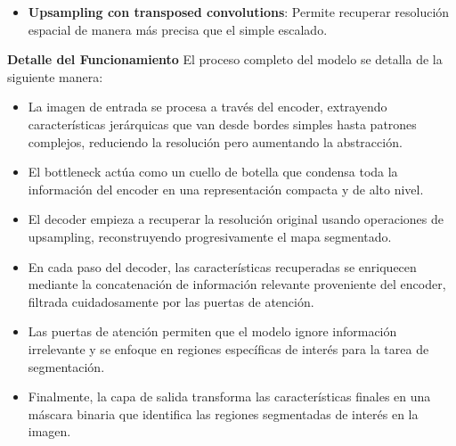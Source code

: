\begin{enumerate}
\begin{itemize}
\begin{itemize}
      

    \item \textbf{Upsampling con transposed convolutions}: Permite recuperar resolución espacial de manera más precisa que el simple escalado.
\end{itemize}


\textbf{Detalle del Funcionamiento}
El proceso completo del modelo se detalla de la siguiente manera:
\begin{itemize}
\item La imagen de entrada se procesa a través del encoder, extrayendo características jerárquicas que van desde bordes simples hasta patrones complejos, reduciendo la resolución pero aumentando la abstracción.
\item El bottleneck actúa como un cuello de botella que condensa toda la información del encoder en una representación compacta y de alto nivel.
\item El decoder empieza a recuperar la resolución original usando operaciones de upsampling, reconstruyendo progresivamente el mapa segmentado.
\item En cada paso del decoder, las características recuperadas se enriquecen mediante la concatenación de información relevante proveniente del encoder, filtrada cuidadosamente por las puertas de atención.
\item Las puertas de atención permiten que el modelo ignore información irrelevante y se enfoque en regiones específicas de interés para la tarea de segmentación.
\item Finalmente, la capa de salida transforma las características finales en una máscara binaria que identifica las regiones segmentadas de interés en la imagen.
\end{itemize}


\end{itemize}
\end{enumerate}
